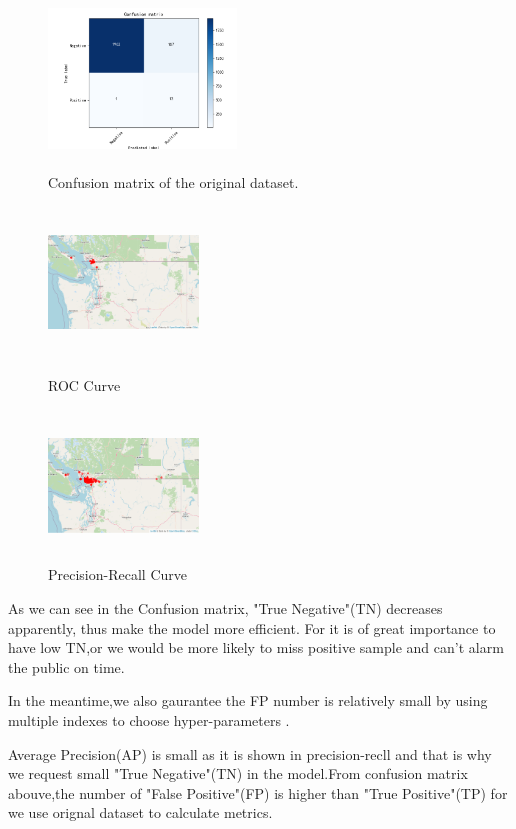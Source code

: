 \documentclass[12pt]{article}
\begin{document}
\begin{figure}[H]
	\small
	\centering
	\begin{minipage}{5cm}
		\label{prob}
		\includegraphics[width=5cm,height=4cm]{./pictures/train_cm.png}
		\caption{Confusion matrix of the original dataset.} 
	\end{minipage}
	\begin{minipage}{4cm}
		\includegraphics[width=4cm,height=4cm]{./pictures/pos.png}
		\caption{ROC Curve}
	\end{minipage}
	\begin{minipage}{4cm}
		\includegraphics[width=4cm,height=4cm]{./pictures/addun.png}
		\caption{Precision-Recall Curve}
	\end{minipage}
\end{figure}


As we can see in the Confusion matrix, "True Negative"(TN) decreases apparently, thus make the model more efficient. For it is of great importance to have low TN,or we would be more likely to miss positive sample and can't alarm the public on time.

In the meantime,we also gaurantee the FP number is relatively small by using multiple indexes to choose hyper-parameters .
 
Average Precision(AP) is small as it is shown in precision-recll and that is why we request small "True Negative"(TN) in the model.From confusion matrix abouve,the number of "False Positive"(FP) is higher than "True Positive"(TP) for we use orignal dataset to calculate metrics.
\end{document}
